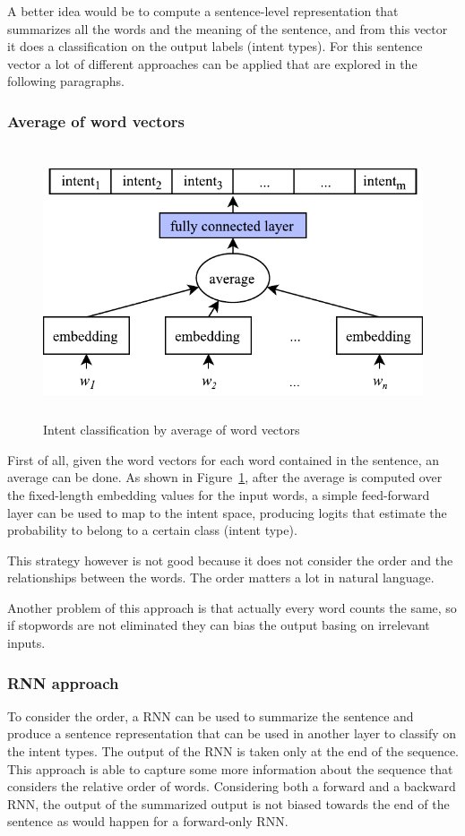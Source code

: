 A better idea would be to compute a sentence-level representation that summarizes all the words and the meaning of the sentence, and from this vector it does a classification on the output labels (intent types). For this sentence vector a lot of different approaches can be applied that are explored in the following paragraphs.

\subsubsection{Average of word vectors}

\begin{figure}[!htb]
    \centering
    \includegraphics[max width=0.7\linewidth,max height=8cm,keepaspectratio]{figures/intentAverage}
    \caption{Intent classification by average of word vectors}\label{fig:intentAverage}
\end{figure}
First of all, given the word vectors for each word contained in the sentence, an average can be done. As shown in Figure~\ref{fig:intentAverage}, after the average is computed over the fixed-length embedding values for the input words, a simple feed-forward layer can be used to map to the intent space, producing logits that estimate the probability to belong to a certain class (intent type).

This strategy however is not good because it does not consider the order and the relationships between the words. The order matters a lot in natural language.

Another problem of this approach is that actually every word counts the same, so if stopwords are not eliminated they can bias the output basing on irrelevant inputs.

\subsubsection{RNN approach}
To consider the order, a RNN can be used to summarize the sentence and produce a sentence representation that can be used in another layer to classify on the intent types. The output of the RNN is taken only at the end of the sequence. This approach is able to capture some more information about the sequence that considers the relative order of words. Considering both a forward and a backward RNN, the output of the summarized output is not biased towards the end of the sentence as would happen for a forward-only RNN.


